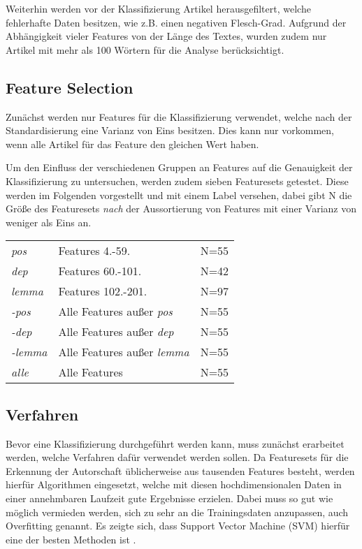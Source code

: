 Weiterhin werden vor der Klassifizierung Artikel herausgefiltert, welche fehlerhafte Daten besitzen, wie z.B. einen negativen Flesch-Grad. Aufgrund der Abhängigkeit vieler Features von der Länge des Textes, wurden zudem nur Artikel mit mehr als 100 Wörtern für die Analyse berücksichtigt.

\subsection{Feature Selection}
Zunächst werden nur Features für die Klassifizierung verwendet, welche nach der Standardisierung eine Varianz von Eins besitzen. Dies kann nur vorkommen, wenn alle Artikel für das Feature den gleichen Wert haben.

Um den Einfluss der verschiedenen Gruppen an Features auf die Genauigkeit der Klassifizierung zu untersuchen, werden zudem sieben Featuresets getestet. Diese werden im Folgenden vorgestellt und mit einem Label versehen, dabei gibt N die Größe des Featuresets \emph{nach} der Aussortierung von Features mit einer Varianz von weniger als Eins an.

\begin{tabular}{llr}
  \emph{pos} & Features 4.-59. & N=55\\
  \emph{dep} & Features 60.-101. & N=42\\
  \emph{lemma} & Features 102.-201. & N=97\\
  \emph{-pos} & Alle Features außer \emph{pos} & N=55\\
  \emph{-dep} & Alle Features außer \emph{dep}& N=55\\
  \emph{-lemma} & Alle Features außer \emph{lemma} & N=55\\
  \emph{alle} & Alle Features & N=55\\
\end{tabular}


\subsection{Verfahren}
Bevor eine Klassifizierung durchgeführt werden kann, muss zunächst erarbeitet werden, welche Verfahren dafür verwendet werden sollen. Da Featuresets für die Erkennung der Autorschaft üblicherweise aus tausenden Features besteht, werden hierfür Algorithmen eingesetzt, welche mit diesen hochdimensionalen Daten in einer annehmbaren Laufzeit gute Ergebnisse erzielen. Dabei muss so gut wie möglich vermieden werden, sich zu sehr an die Trainingsdaten anzupassen, auch Overfitting genannt. Es zeigte sich, dass Support Vector Machine (SVM) hierfür eine der besten Methoden ist \cite{li2006fingerprint, stamatatos2009survey}.

